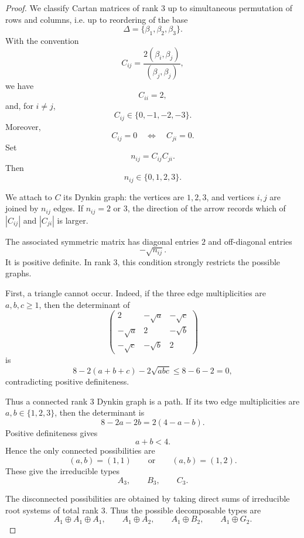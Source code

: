 \begin{proof}
    We classify Cartan matrices of rank \(3\) up to simultaneous permutation of
    rows and columns, i.e. up to reordering of the base
    \[
        \Delta=\{\beta_1,\beta_2,\beta_3\}.
    \]
    With the convention
    \[
        C_{ij}=\frac{2(\beta_i,\beta_j)}{(\beta_j,\beta_j)},
    \]
    we have
    \[
        C_{ii}=2,
    \]
    and, for \(i\neq j\),
    \[
        C_{ij}\in\{0,-1,-2,-3\}.
    \]
    Moreover,
    \[
        C_{ij}=0
        \quad\Longleftrightarrow\quad
        C_{ji}=0.
    \]
    Set
    \[
        n_{ij}=C_{ij}C_{ji}.
    \]
    Then
    \[
        n_{ij}\in\{0,1,2,3\}.
    \]
    
    We attach to \(C\) its Dynkin graph: the vertices are \(1,2,3\), and vertices
    \(i,j\) are joined by \(n_{ij}\) edges. If \(n_{ij}=2\) or \(3\), the direction of
    the arrow records which of \(|C_{ij}|\) and \(|C_{ji}|\) is larger.
    
    The associated symmetric matrix has diagonal entries \(2\) and off-diagonal
    entries
    \[
        -\sqrt{n_{ij}}.
    \]
    It is positive definite. In rank \(3\), this condition strongly restricts the
    possible graphs.
    
    First, a triangle cannot occur. Indeed, if the three edge multiplicities are
    \(a,b,c\geq 1\), then the determinant of
    \[
        \begin{pmatrix}
            2&-\sqrt a&-\sqrt c\\
            -\sqrt a&2&-\sqrt b\\
            -\sqrt c&-\sqrt b&2
        \end{pmatrix}
    \]
    is
    \[
        8-2(a+b+c)-2\sqrt{abc}\leq 8-6-2=0,
    \]
    contradicting positive definiteness.
    
    Thus a connected rank \(3\) Dynkin graph is a path. If its two edge
    multiplicities are \(a,b\in\{1,2,3\}\), then the determinant is
    \[
        8-2a-2b=2(4-a-b).
    \]
    Positive definiteness gives
    \[
        a+b<4.
    \]
    Hence the only connected possibilities are
    \[
        (a,b)=(1,1)
        \qquad\text{or}\qquad
        (a,b)=(1,2).
    \]
    These give the irreducible types
    \[
        A_3,\qquad B_3,\qquad C_3.
    \]
    
    The disconnected possibilities are obtained by taking direct sums of
    irreducible root systems of total rank \(3\). Thus the possible decomposable
    types are
    \[
        A_1\oplus A_1\oplus A_1,\qquad
        A_1\oplus A_2,\qquad
        A_1\oplus B_2,\qquad
        A_1\oplus G_2.
    \]
    

\end{proof}
